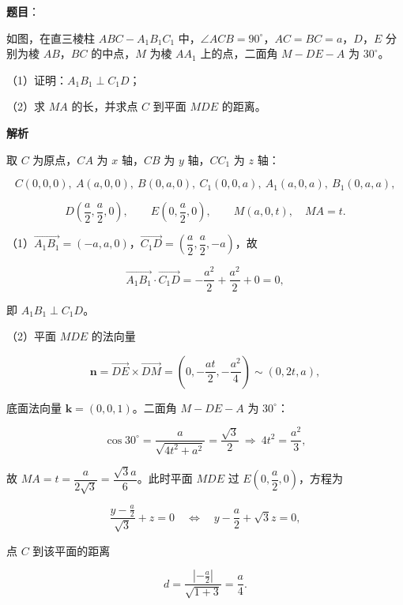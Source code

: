 \begin{answer}

\textbf{题目}：

如图，在直三棱柱 $ABC-A_1B_1C_1$ 中，$\angle ACB=90^\circ$，$AC=BC=a$，$D$，$E$ 分别为棱 $AB$，$BC$ 的中点，$M$ 为棱 $AA_1$ 上的点，二面角 $M-DE-A$ 为 $30^\circ$。

（1）证明：$A_1B_1\perp C_1D$；

（2）求 $MA$ 的长，并求点 $C$ 到平面 $MDE$ 的距离。
\nopagebreak[4]
\begin{center}\end{center}
\nopagebreak[4]
\textbf{解析}

取 $C$ 为原点，$CA$ 为 $x$ 轴，$CB$ 为 $y$ 轴，$CC_1$ 为 $z$ 轴：

\nopagebreak[4]
\[C(0,0,0),\ A(a,0,0),\ B(0,a,0),\ C_1(0,0,a),\ A_1(a,0,a),\ B_1(0,a,a),\]

\nopagebreak[4]
\[D\left(\frac a2,\frac a2,0\right),\qquad E\left(0,\frac a2,0\right),\qquad M(a,0,t),\quad MA=t.\]

（1）$\overrightarrow{A_1B_1}=(-a,a,0)$，$\overrightarrow{C_1D}=\left(\dfrac a2,\dfrac a2,-a\right)$，故

\nopagebreak[4]
\[\overrightarrow{A_1B_1}\cdot\overrightarrow{C_1D}=-\frac{a^2}2+\frac{a^2}2+0=0,\]

即 $A_1B_1\perp C_1D$。

（2）平面 $MDE$ 的法向量

\nopagebreak[4]
\[\boldsymbol n=\overrightarrow{DE}\times\overrightarrow{DM}=\left(0,-\frac{at}2,-\frac{a^2}4\right)\sim(0,2t,a),\]

底面法向量 $\boldsymbol k=(0,0,1)$。二面角 $M-DE-A$ 为 $30^\circ$：

\nopagebreak[4]
\[\cos30^\circ=\frac{a}{\sqrt{4t^2+a^2}}=\frac{\sqrt3}2\ \Rightarrow\ 4t^2=\frac{a^2}3,\]

故 $MA=t=\dfrac{a}{2\sqrt3}=\dfrac{\sqrt3a}6$。此时平面 $MDE$ 过 $E\left(0,\dfrac a2,0\right)$，方程为

\nopagebreak[4]
\[\frac{y-\frac a2}{\sqrt3}+z=0\quad\Longleftrightarrow\quad y-\frac a2+\sqrt3z=0,\]

点 $C$ 到该平面的距离

\nopagebreak[4]
\[d=\frac{\left|-\frac a2\right|}{\sqrt{1+3}}=\frac a4.\]


\end{answer}
